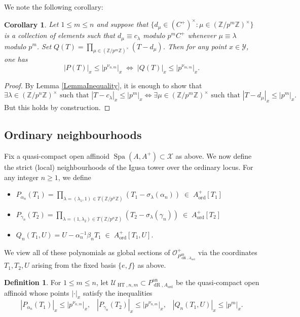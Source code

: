 \documentclass[10pt, oneside]{amsart}
\numberwithin{equation}{subsection}
\newtheorem{corollary}[equation]{Corollary}
\theoremstyle{definition}
\newtheorem{definition}[equation]{Definition}
\theoremstyle{remark}
\newcommand{\mbb}[1]{\mathbb{#1}}
\newcommand{\opn}[1]{\operatorname{#1}}
\begin{document}
We note the following corollary:

\begin{corollary} \label{CorollaryInequalityPolynomials}
Let $1 \leq m \leq n$ and suppose that $\{ d_{\mu} \in (C^+)^{\times} : \mu \in \left(\mbb{Z}/p^m \mbb{Z} \right)^{\times} \}$ is a collection of elements such that $d_{\mu} \equiv c_{\lambda}$ modulo $p^m C^+$ whenever $\mu \equiv \lambda$ modulo $p^m$. Set $Q(T) = \prod_{\mu \in \left(\mbb{Z}/p^m \mbb{Z}\right)^{\times}} (T - d_{\mu})$. Then for any point $x \in \mathcal{Y}$, one has
\[
|P(T)|_x \leq |p^{\nu_{n, m}}|_x \; \Longleftrightarrow \; |Q(T)|_x \leq |p^{\nu_{m, m}}|_x.
\]
\end{corollary}
\begin{proof}
By Lemma \ref{LemmaInequality}, it is enough to show that
\[
\exists \lambda \in \left(\mbb{Z}/p^n \mbb{Z} \right)^{\times} \text{ such that } |T - c_{\lambda} |_x  \leq |p^{m}|_x \Longleftrightarrow \exists \mu \in \left(\mbb{Z}/p^m \mbb{Z} \right)^{\times} \text{ such that } |T - d_{\mu} |_x  \leq |p^{m}|_x .
\]
But this holds by construction.
\end{proof}

\subsection{Ordinary neighbourhoods} \label{OrdinaryNHoodsSubSec}

Fix a quasi-compact open affinoid $\opn{Spa}(A, A^+) \subset \mathcal{X}$ as above. We now define the strict (local) neighbourhoods of the Igusa tower over the ordinary locus. For any integer $n \geq 1$, we define 
\begin{itemize}
    \item $P_{\alpha_n}(T_1) = \prod_{\lambda = (\lambda_1, 1) \in T(\mbb{Z}/p^n \mbb{Z})} (T_1 - \sigma_{\lambda}(\alpha_n)) \; \in \; A_{\opn{ord}}^+[T_1]$
    \item $P_{\gamma_n}(T_2) = \prod_{\lambda = (1, \lambda_2) \in T(\mbb{Z}/p^n \mbb{Z})} (T_2 - \sigma_{\lambda}(\gamma_n)) \; \in \; A_{\opn{ord}}^+[T_2]$
    \item $Q_n(T_1, U) = U - \alpha_n^{-1}\beta_n T_1 \; \in \; A_{\opn{ord}}^+[T_1, U]$.
\end{itemize}
We view all of these polynomials as global sections of $\mathcal{O}^+_{P_{\opn{dR}, A_{\opn{ord}}}^{\opn{an}}}$ via the coordinates $T_1, T_2, U$ arising from the fixed basis $\{ e, f \}$ as above.

\begin{definition}
For $1 \leq m \leq n$, let $\mathcal{U}_{\opn{HT}, n, m} \subset P_{\opn{dR}, A_{\opn{ord}}}^{\opn{an}}$ be the quasi-compact open affinoid whose points $| \cdot |_x$ satisfy the inequalities
\[ 
|P_{\alpha_n}(T_1)|_x \leq |p^{\nu_{n, m}}|_x, \;\;\; |P_{\gamma_n}(T_2)|_x \leq |p^{\nu_{n, m}}|_x, \; \; \; |Q_n(T_1, U) |_x \leq |p^{m}|_x. 
\]
\end{definition}
\end{document}
